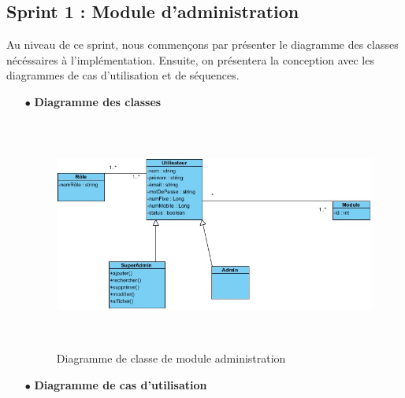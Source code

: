 \documentclass{article}
\begin{document}
\subsection{Sprint 1 : Module d'administration}
Au niveau de ce sprint, nous commençons par présenter le diagramme des classes nécéssaires à l'implémentation. Ensuite, on présentera
la conception avec les diagrammes de cas d'utilisation et de  séquences. 
\begin{enumerate}
\item[$\bullet$] \textbf{ Diagramme des classes}
\begin{figure}[H]
\centering
\includegraphics[height=3in]{DiagClass1.jpg}
\caption[Figure9 : Diagramme de classe de module administration]{Diagramme de classe de module administration}
\label{fig:pic9}
\end{figure}
\item[$\bullet$] \textbf{ Diagramme de cas d'utilisation}\\


\end{enumerate}
\end{document}
